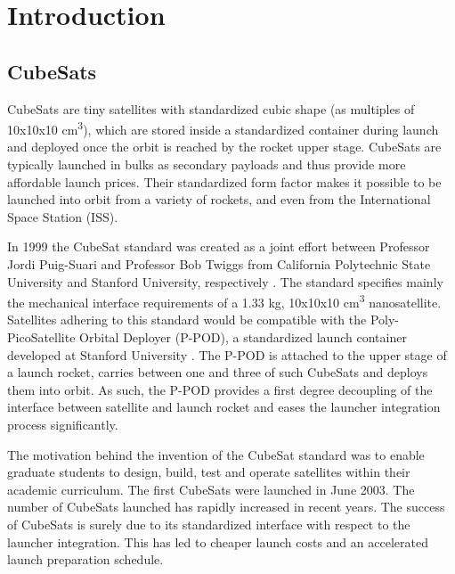\chapter{Introduction}

\section{CubeSats}

CubeSats are tiny satellites with standardized cubic shape (as multiples of 10x10x10 cm\textsuperscript{3}), which are stored inside a standardized container during launch and deployed once the orbit is reached by the rocket upper stage. CubeSats are typically launched in bulks as secondary payloads and thus provide more affordable launch prices. Their standardized form factor makes it possible to be launched into orbit from a variety of rockets, and even from the International Space Station (ISS).

In 1999 the CubeSat standard was created as a joint effort between Professor Jordi Puig-Suari and Professor Bob Twiggs from California Polytechnic State University and Stanford University, respectively \cite{heidt2000cubesat}. The standard specifies mainly the mechanical interface requirements of a 1.33 kg, 10x10x10 cm\textsuperscript{3} nanosatellite. Satellites adhering to this standard would be compatible with the Poly-PicoSatellite Orbital Deployer (P-POD), a standardized launch container developed at Stanford University \cite{nason2002development}. The P-POD is attached to the upper stage of a launch rocket, carries between one and three of such CubeSats and deploys them into orbit. As such, the P-POD provides a first degree decoupling of the interface between satellite and launch rocket and eases the launcher integration process significantly.

The motivation behind the invention of the CubeSat standard was to enable graduate students to design, build, test and operate satellites within their academic curriculum. The first CubeSats were launched in June 2003. The number of CubeSats launched has rapidly increased in recent years. The success of CubeSats is surely due to its standardized interface with respect to the launcher integration. This has led to cheaper launch costs and an accelerated launch preparation schedule.

